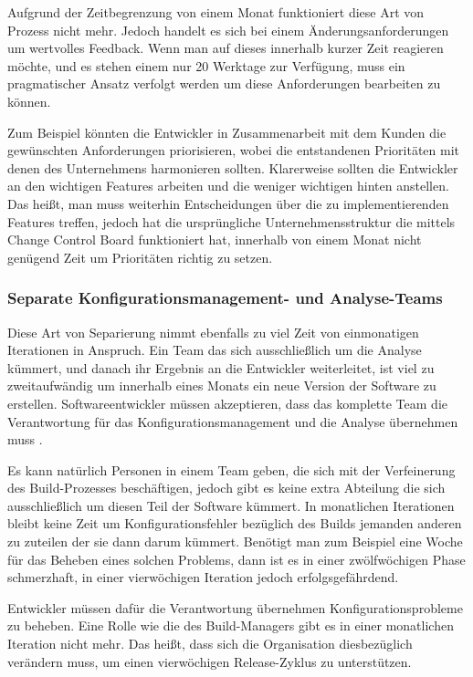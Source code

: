 Aufgrund der Zeitbegrenzung von einem Monat funktioniert diese Art von Prozess nicht mehr. Jedoch handelt es sich bei einem Änderungsanforderungen um wertvolles Feedback. Wenn man auf dieses innerhalb kurzer Zeit reagieren möchte, und es stehen einem nur 20 Werktage zur Verfügung, muss ein pragmatischer Ansatz verfolgt werden um diese Anforderungen bearbeiten zu können. 

Zum Beispiel könnten die Entwickler in Zusammenarbeit mit dem Kunden die gewünschten Anforderungen priorisieren, wobei die entstandenen Prioritäten mit denen des Unternehmens harmonieren sollten. Klarerweise sollten die Entwickler an den wichtigen Features arbeiten und die weniger wichtigen hinten anstellen. Das heißt, man muss weiterhin Entscheidungen über die zu implementierenden Features treffen, jedoch hat die ursprüngliche Unternehmensstruktur die mittels Change Control Board funktioniert hat, innerhalb von einem Monat nicht genügend Zeit um Prioritäten richtig zu setzen.

\subsubsection{Separate Konfigurationsmanagement- und Analyse-Teams}
Diese Art von Separierung nimmt ebenfalls zu viel Zeit von einmonatigen Iterationen in Anspruch. Ein Team das sich ausschließlich um die Analyse kümmert, und danach ihr Ergebnis an die Entwickler weiterleitet, ist viel zu zweitaufwändig um innerhalb eines Monats ein neue Version der Software zu erstellen. Softwareentwickler müssen akzeptieren, dass das komplette Team die Verantwortung für das Konfigurationsmanagement und die Analyse übernehmen muss \cite{dpunktkonfig2008}.

Es kann natürlich Personen in einem Team geben, die sich mit der Verfeinerung des Build-Prozesses beschäftigen, jedoch gibt es keine extra Abteilung die sich ausschließlich um diesen Teil der Software kümmert. In monatlichen Iterationen bleibt keine Zeit um Konfigurationsfehler bezüglich des Builds jemanden anderen zu zuteilen der sie dann darum kümmert. Benötigt man zum Beispiel eine Woche für das Beheben eines solchen Problems, dann ist es in einer zwölfwöchigen Phase schmerzhaft, in einer vierwöchigen Iteration jedoch erfolgsgefährdend. 

Entwickler müssen dafür die Verantwortung übernehmen Konfigurationsprobleme zu beheben. Eine Rolle wie die des Build-Managers gibt es in einer monatlichen Iteration nicht mehr. Das heißt, dass sich die Organisation diesbezüglich verändern muss, um einen vierwöchigen Release-Zyklus zu unterstützen.
